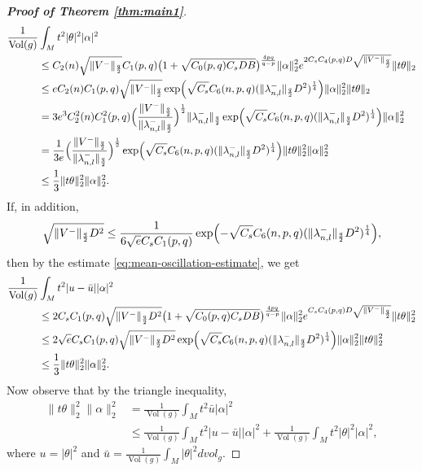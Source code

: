 \documentclass[12pt, twoside]{article}
\theoremstyle{definition}
\numberwithin{equation}{section}
\def \la {\lambda}
\begin{document}
\begin{proof}[\textbf{Proof of Theorem \ref{thm:main1}}]
		\begin{align*}
		\frac{1}{\operatorname{Vol}(g)} &\int_M t^2|\theta|^2 |\alpha|^2 \\
		&\le C_2(n) \sqrt{\|V^{-}\|_\frac{q}{2}} C_1(p,q) 
		\bigl(1 + \sqrt{C_0(p,q)C_s D B}\bigr)^{\frac{4pq}{q-p}}
		\|\alpha\|_2^2 e^{2C_sC_4(p,q) D\sqrt{\|V^{-}\|_\frac{q}{2} }} \|t\theta\|_2 \\
		&\le e C_2(n) C_1(p,q) \sqrt{\|V^{-}\|_\frac{q}{2}}	\exp\Bigl(\sqrt{C_s}C_6(n,p,q)(\|\la^{-}_{n,l}\|_{\frac{q}{2}}D^{2})^{\frac{1}{4}}\Bigr )\|\alpha\|_2^2 \|t\theta\|_2 \\
		&= 3e^3 C_2^2(n) C^2_1(p,q)
		\Bigl(\frac{\|V^{-}\|_\frac{q}{2}}{\|\la^{-}_{n,l}\|_\frac{q}{2}}\Bigr)^{\frac{1}{2}}\|\la^{-}_{n,l}\|_\frac{q}{2}\exp\Bigl(\sqrt{C_s}C_6(n,p,q)(\|\la^{-}_{n,l}\|_{\frac{q}{2}}D^{2})^{\frac{1}{4}}\Bigr )
		\|\alpha\|_2^2 \\
		&= \frac{1}{3e} 
		\Bigl(\frac{\|V^{-}\|_\frac{q}{2}}{\|\la^{-}_{n,l}\|_\frac{q}{2}}\Bigr)^{\frac{1}{2}}\exp\Bigl(\sqrt{C_s}C_6(n,p,q)(\|\la^{-}_{n,l}\|_{\frac{q}{2}}D^{2})^{\frac{1}{4}}\Bigr )
		\|t\theta\|_2^2 \|\alpha\|_2^2\\
		&\leq \frac{1}{3}
		\|t\theta\|_2^2 \|\alpha\|_2^2.
		\end{align*}    
If, in addition, 
		\begin{equation}	\label{V1}
		\sqrt{\|V^{-}\|_\frac{q}{2} D^2} \le \frac{1}{6\sqrt{e}C_s C_{1}(p,q)}\exp\Bigl(-\sqrt{C_s}C_6(n,p,q)(\|\la^{-}_{n,l}\|_{\frac{q}{2}}D^{2})^{\frac{1}{4}}\Bigr ),
		\end{equation}	
	then by the estimate \eqref{eq:mean-oscillation-estimate}, we get
		\begin{align*}
		\frac{1}{\operatorname{Vol}(g)} &\int_M t^2 |u - \bar{u}| |\alpha|^2 \\
		&\le 2C_s C_1(p,q) \sqrt{\|V^{-}\|_\frac{q}{2} D^2}
		\bigl(1 + \sqrt{C_0(p,q)C_s D B}\bigr)^{\frac{4pq}{q-p}}
		\|\alpha\|_2^2 e^{C_sC_4(p,q)D\sqrt{\|V^{-}\|_\frac{q}{2}  }} \|t\theta\|_2^2 \\
		&\le 2\sqrt{e} C_s C_1(p,q) 
		\sqrt{\|V^{-}\|_\frac{q}{2} D^2}\exp\Bigl(\sqrt{C_s}C_6(n,p,q)(\|\la^{-}_{n,l}\|_{\frac{q}{2}}D^{2})^{\frac{1}{4}}\Bigr ) \|\alpha\|_2^2 \|t\theta\|_2^2 \\
		&\le \frac{1}{3} \|t\theta\|_2^2 \|\alpha\|_2^2.
		\end{align*}    
		Now observe that by the triangle inequality,
			\begin{align*}
		\|t\theta\|_2^2 \|\alpha\|_2^2 
	&	= \frac{1}{\operatorname{Vol}(g)} \int_M t^2 \bar{u} |\alpha|^2\\
		&\le \frac{1}{\operatorname{Vol}(g)} \int_M t^2 |u - \bar{u}| |\alpha|^2
		+ \frac{1}{\operatorname{Vol}(g)} \int_M t^2 |\theta|^2 |\alpha|^2,
			\end{align*}   
	where $u=|\theta|^{2}$ and $\bar{u}=\frac{1}{\operatorname{Vol}(g)}\int_{M}|\theta|^{2}dvol_{g}$.
	

\end{proof}
\end{document}
